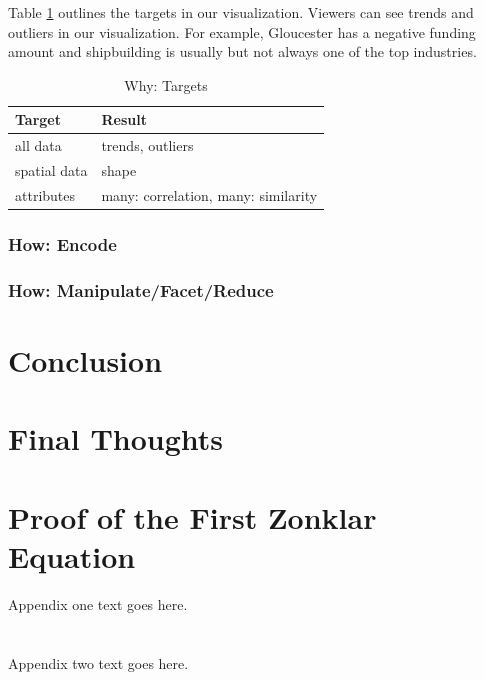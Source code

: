 \documentclass[10pt,journal,compsoc]{IEEEtran}
\begin{document}
Table \ref{tab:why-targets} outlines the targets in our visualization. Viewers can see trends and outliers in our visualization. For example, Gloucester has a negative funding amount and shipbuilding is usually but not always one of the top industries.

\begin{table}[t]
\centering
\begin{tabular}{l | l}
\textbf{Target} & \textbf{Result} \\
\hline
all data & trends, outliers\\
\hline
spatial data & shape \\
\hline
attributes & many: correlation, many: similarity \\
\hline
\end{tabular}

\caption{Why: Targets}
\label{tab:why-targets}

\end{table} 

\subsubsection{How: Encode}

\subsubsection{How: Manipulate/Facet/Reduce}


\section{Conclusion}


\section{Final Thoughts}


\appendices
\section{Proof of the First Zonklar Equation}
Appendix one text goes here.

\section{}
Appendix two text goes here.


\ifCLASSOPTIONcompsoc
\end{document}
